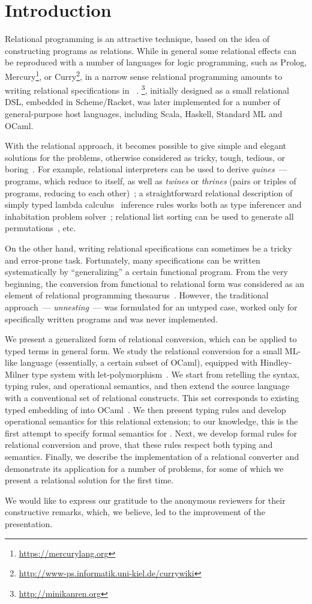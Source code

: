\section{Introduction}
\label{intro}

Relational programming is an attractive technique, based on the idea of constructing programs as relations.
While in general some relational effects can be reproduced with a number of languages for logic programming, such as
Prolog, Mercury\footnote{\url{https://mercurylang.org}}, or Curry\footnote{\url{http://www-ps.informatik.uni-kiel.de/currywiki}}, in
a narrow sense relational programming amounts to writing relational specifications in \miniKanren~\cite{TRS}. \miniKanren\footnote{\url{http://minikanren.org}},
initially designed as a small relational DSL, embedded in Scheme/Racket, was later implemented for a number of general-purpose host languages,
including Scala, Haskell, Standard ML and OCaml.

With the relational approach, it becomes possible to give simple and elegant solutions for the problems, otherwise
considered as tricky, tough, tedious, or boring~\cite{unified}. For example, relational interpreters can be used to derive
\emph{quines}~--- programs, which reduce to itself, as well as \emph{twines} or \emph{thrines} (pairs or triples of
programs, reducing to each other)~\cite{Untagged}; a straightforward relational description of
simply typed lambda calculus~\cite{Lambda} inference rules works both as type inferencer and inhabitation problem solver~\cite{WillThesis};
relational list sorting can be used to generate all permutations~\cite{ocanren}, etc. 

On the other hand, writing relational specifications can sometimes be a tricky and error-prone task. Fortunately, many 
specifications can be written systematically by ``generalizing'' a certain functional program. From the very beginning, 
the conversion from functional to relational form was considered as an element of relational programming thesaurus~\cite{TRS}. However,
the traditional approach~--- \emph{unnesting}~--- was formulated for an untyped case, worked only for specifically written
programs and was never implemented.

We present a generalized form of relational conversion, which can be applied to typed terms in general form. We study the relational conversion 
for a small ML-like language (essentially, a certain subset of OCaml), equipped with Hindley-Milner type system with let-polymorphism~\cite{Types}. 
We start from retelling the syntax, typing rules, and operational semantics, and then extend the source language with a conventional set of 
relational constructs. This set corresponds to existing typed embedding of \miniKanren into OCaml~\cite{ocanren}. We then present typing rules and 
develop operational semantics for this relational extension; to our knowledge, this is the first attempt to specify formal semantics for
\miniKanren. Next, we develop formal rules for relational conversion and prove, that these rules respect both typing and
semantics. Finally, we describe the implementation of a relational converter and demonstrate its application for a number of problems, for some
of which we present a relational solution for the first time.

We would like to express our gratitude to the anonymous reviewers for their constructive remarks, which, we believe, led to the improvement of the presentation. 
